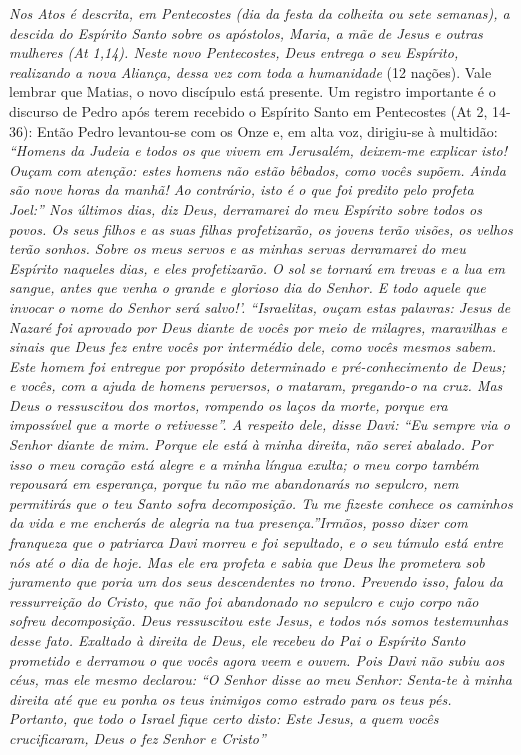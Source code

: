 \documentclass[
]{book}
\begin{document}
\emph{Nos Atos é descrita, em Pentecostes (dia da festa da colheita ou sete semanas), a descida do Espírito Santo sobre os apóstolos, Maria, a mãe de Jesus e outras mulheres (At 1,14). Neste novo Pentecostes, Deus entrega o seu Espírito, realizando a nova Aliança, dessa vez com toda a humanidade} (12 nações). Vale lembrar que Matias, o novo discípulo está presente. Um registro importante é o discurso de Pedro após terem recebido o Espírito Santo em Pentecostes (At 2, 14- 36): Então Pedro levantou-se com os Onze e, em alta voz, dirigiu-se à multidão: \emph{``Homens da Judeia e todos os que vivem em Jerusalém, deixem-me explicar isto! Ouçam com atenção: estes homens não estão bêbados, como vocês supõem. Ainda são nove horas da manhã! Ao contrário, isto é o que foi predito pelo profeta Joel:'' Nos últimos dias, diz Deus, derramarei do meu Espírito sobre todos os povos. Os seus filhos e as suas filhas profetizarão, os jovens terão visões, os velhos terão sonhos. Sobre os meus servos e as minhas servas derramarei do meu Espírito naqueles dias, e eles profetizarão. O sol se tornará em trevas e a lua em sangue, antes que venha o grande e glorioso dia do Senhor. E todo aquele que invocar o nome do Senhor será salvo!'. ``Israelitas, ouçam estas palavras: Jesus de Nazaré foi aprovado por Deus diante de vocês por meio de milagres, maravilhas e sinais que Deus fez entre vocês por intermédio dele, como vocês mesmos sabem. Este homem foi entregue por propósito determinado e pré-conhecimento de Deus; e vocês, com a ajuda de homens perversos, o mataram, pregando-o na cruz. Mas Deus o ressuscitou dos mortos, rompendo os laços da morte, porque era impossível que a morte o retivesse''. A respeito dele, disse Davi: ``Eu sempre via o Senhor diante de mim. Porque ele está à minha direita, não serei abalado. Por isso o meu coração está alegre e a minha língua exulta; o meu corpo também repousará em esperança, porque tu não me abandonarás no sepulcro, nem permitirás que o teu Santo sofra decomposição. Tu me fizeste conhece os caminhos da vida e me encherás de alegria na tua presença.''Irmãos, posso dizer com franqueza que o patriarca Davi morreu e foi sepultado, e o seu túmulo está entre nós até o dia de hoje. Mas ele era profeta e sabia que Deus lhe prometera sob juramento que poria um dos seus descendentes no trono. Prevendo isso, falou da ressurreição do Cristo, que não foi abandonado no sepulcro e cujo corpo não sofreu decomposição. Deus ressuscitou este Jesus, e todos nós somos testemunhas desse fato. Exaltado à direita de Deus, ele recebeu do Pai o Espírito Santo prometido e derramou o que vocês agora veem e ouvem. Pois Davi não subiu aos céus, mas ele mesmo declarou: ``O Senhor disse ao meu Senhor: Senta-te à minha direita até que eu ponha os teus inimigos como estrado para os teus pés. Portanto, que todo o Israel fique certo disto: Este Jesus, a quem vocês crucificaram, Deus o fez Senhor e Cristo''}
\end{document}
